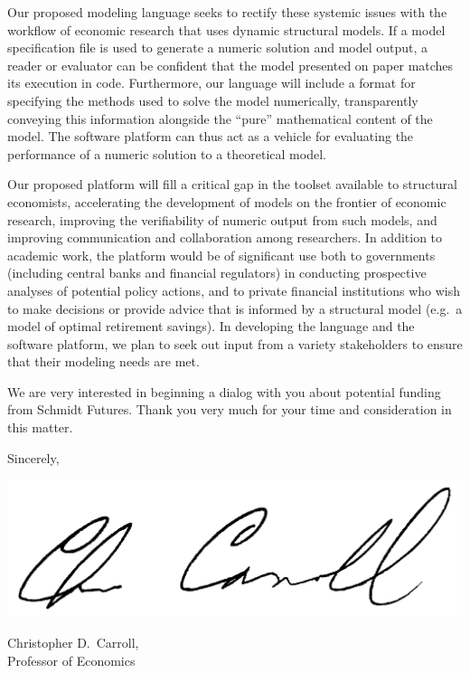 \documentclass[11pt,pdftex,letterpaper]{article}
\begin{document}
Our proposed modeling language seeks to rectify these systemic issues with the workflow of economic research that uses dynamic structural models. If a model specification file is used to generate a numeric solution and model output, a reader or evaluator can be confident that the model presented on paper matches its execution in code. Furthermore, our language will include a format for specifying the methods used to solve the model numerically, transparently conveying this information alongside the ``pure'' mathematical content of the model. The software platform can thus act as a vehicle for evaluating the performance of a numeric solution to a theoretical model.

Our proposed platform will fill a critical gap in the toolset available to structural economists, accelerating the development of models on the frontier of economic research, improving the verifiability of numeric output from such models, and improving communication and collaboration among researchers. In addition to academic work, the platform would be of significant use both to governments (including central banks and financial regulators) in conducting prospective analyses of potential policy actions, and to private financial institutions who wish to make decisions or provide advice that is informed by a structural model (e.g.\ a model of optimal retirement savings). In developing the language and the software platform, we plan to seek out input from a variety stakeholders to ensure that their modeling needs are met.

We are very interested in beginning a dialog with you about potential funding from Schmidt Futures. Thank you very much for your time and consideration in this matter.

\vspace{0.5cm}

{\parskip=2pt Sincerely,

\includegraphics[scale=0.7]{CDCsignature.jpg}

Christopher D.\ Carroll,\\ Professor of Economics}
\end{document}

